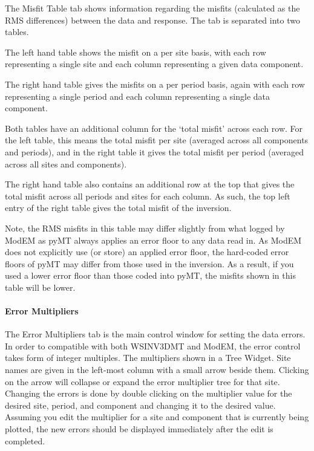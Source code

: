 \documentclass[letterpaper,10pt,english]{sphinxmanual}
\begin{document}
The Misfit Table tab shows information regarding the misfits (calculated as the RMS differences) between the data and response. The tab is separated into two tables.

The left hand table shows the misfit on a per site basis, with each row representing a single site and each column representing a given data component.

The right hand table gives the misfits on a per period basis, again with each row representing a single period and each column representing a single data component.

Both tables have an additional column for the ‘total misfit’ across each row. For the left table, this means the total misfit per site (averaged across all components and periods), and in the right table it gives the total misfit per period (averaged across all sites and components).

The right hand table also contains an additional row at the top that gives the total misfit across all periods and sites for each column. As such, the top left entry of the right table gives the total misfit of the inversion.

Note, the RMS misfits in this table may differ slightly from what logged by ModEM as pyMT always applies an error floor to any data read in. As ModEM does not explicitly use (or store) an applied error floor, the hard-coded error floors of pyMT may differ from those used in the inversion. As a result, if you used a lower error floor than those coded into pyMT, the misfits shown in this table will be lower.


\paragraph{Error Multipliers}
\label{\detokenize{content/data_plot/main_window:error-multipliers}}\label{\detokenize{content/data_plot/main_window:id9}}
\begin{figure}[htbp]
\centering

\noindent{}
\end{figure}

The Error Multipliers tab is the main control window for setting the data errors. In order to compatible with both WSINV3DMT and ModEM, the error control takes form of integer multiples.
The multipliers shown in a Tree Widget. Site names are given in the left-most column with a small arrow beside them. Clicking on the arrow will collapse or expand the error multiplier tree for that site.
Changing the errors is done by double clicking on the multiplier value for the desired site, period, and component and changing it to the desired value. Assuming you edit the multiplier for a site and component that is currently being plotted, the new errors should be displayed immediately after the edit is completed.
\end{document}
